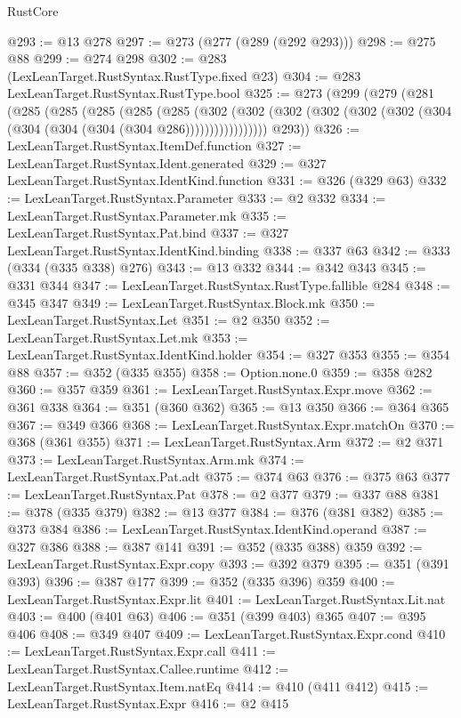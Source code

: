 \begin{lexlean}{RustCore}
\begin{coremodule}
@293 := @13 @278
@297 := @273 (@277 (@289 (@292 @293)))
@298 := @275 @88
@299 := @274 @298
@302 := @283 (LexLeanTarget.RustSyntax.RustType.fixed @23)
@304 := @283 LexLeanTarget.RustSyntax.RustType.bool
@325 := @273
    (@299
      (@279
        (@281
          (@285
            (@285
              (@285
                (@285
                  (@285
                    (@302
                      (@302
                        (@302 (@302 (@302 (@302 (@304 (@304 (@304 (@304 (@304 @286)))))))))))))))))
        @293))
@326 := LexLeanTarget.RustSyntax.ItemDef.function
@327 := LexLeanTarget.RustSyntax.Ident.generated
@329 := @327 LexLeanTarget.RustSyntax.IdentKind.function
@331 := @326 (@329 @63)
@332 := LexLeanTarget.RustSyntax.Parameter
@333 := @2 @332
@334 := LexLeanTarget.RustSyntax.Parameter.mk
@335 := LexLeanTarget.RustSyntax.Pat.bind
@337 := @327 LexLeanTarget.RustSyntax.IdentKind.binding
@338 := @337 @63
@342 := @333 (@334 (@335 @338) @276)
@343 := @13 @332
@344 := @342 @343
@345 := @331 @344
@347 := LexLeanTarget.RustSyntax.RustType.fallible @284
@348 := @345 @347
@349 := LexLeanTarget.RustSyntax.Block.mk
@350 := LexLeanTarget.RustSyntax.Let
@351 := @2 @350
@352 := LexLeanTarget.RustSyntax.Let.mk
@353 := LexLeanTarget.RustSyntax.IdentKind.holder
@354 := @327 @353
@355 := @354 @88
@357 := @352 (@335 @355)
@358 := Option.none.{0}
@359 := @358 @282
@360 := @357 @359
@361 := LexLeanTarget.RustSyntax.Expr.move
@362 := @361 @338
@364 := @351 (@360 @362)
@365 := @13 @350
@366 := @364 @365
@367 := @349 @366
@368 := LexLeanTarget.RustSyntax.Expr.matchOn
@370 := @368 (@361 @355)
@371 := LexLeanTarget.RustSyntax.Arm
@372 := @2 @371
@373 := LexLeanTarget.RustSyntax.Arm.mk
@374 := LexLeanTarget.RustSyntax.Pat.adt
@375 := @374 @63
@376 := @375 @63
@377 := LexLeanTarget.RustSyntax.Pat
@378 := @2 @377
@379 := @337 @88
@381 := @378 (@335 @379)
@382 := @13 @377
@384 := @376 (@381 @382)
@385 := @373 @384
@386 := LexLeanTarget.RustSyntax.IdentKind.operand
@387 := @327 @386
@388 := @387 @141
@391 := @352 (@335 @388) @359
@392 := LexLeanTarget.RustSyntax.Expr.copy
@393 := @392 @379
@395 := @351 (@391 @393)
@396 := @387 @177
@399 := @352 (@335 @396) @359
@400 := LexLeanTarget.RustSyntax.Expr.lit
@401 := LexLeanTarget.RustSyntax.Lit.nat
@403 := @400 (@401 @63)
@406 := @351 (@399 @403) @365
@407 := @395 @406
@408 := @349 @407
@409 := LexLeanTarget.RustSyntax.Expr.cond
@410 := LexLeanTarget.RustSyntax.Expr.call
@411 := LexLeanTarget.RustSyntax.Callee.runtime
@412 := LexLeanTarget.RustSyntax.Item.natEq
@414 := @410 (@411 @412)
@415 := LexLeanTarget.RustSyntax.Expr
@416 := @2 @415

\end{coremodule}
\end{lexlean}
